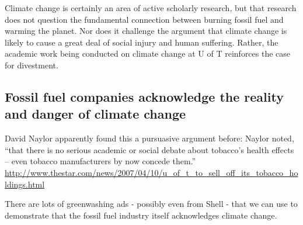Climate change is certainly an area of active scholarly research, but that research does not question the fundamental connection between burning fossil fuel and warming the planet. 
Nor does it challenge the argument that climate change is likely to cause a great deal of social injury and human suffering.
Rather, the academic work being conducted on climate change at U of T reinforces the case for divestment.



	\subsection{Fossil fuel companies acknowledge the reality and danger of climate change}
	
\begin{vcom}
	David Naylor apparently found this a pursuasive argument before: Naylor noted, ``that there is no serious academic or social debate about tobacco's health effects – even tobacco manufacturers by now concede them.'' \url{http://www.thestar.com/news/2007/04/10/u_of_t_to_sell_off_its_tobacco_holdings.html}
	
	There are lots of greenwashing ads - possibly even from Shell - that we can use to demonstrate that the fossil fuel industry itself acknowledges climate change.
	
	
\end{vcom}


